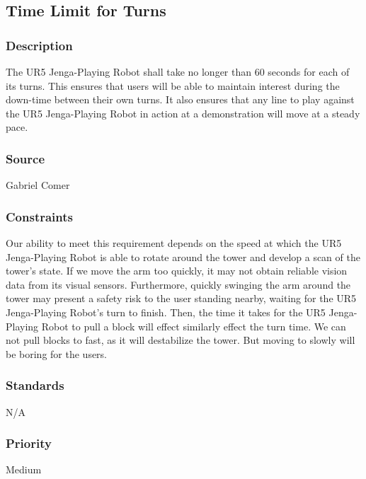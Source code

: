 \subsection{Time Limit for Turns}
\subsubsection{Description}
The UR5 Jenga-Playing Robot shall take no longer than 60 seconds for each of its turns. This ensures that users will be able to maintain interest during the down-time between their own turns. It also ensures that any line to play against the UR5 Jenga-Playing Robot in action at a demonstration will move at a steady pace.
\subsubsection{Source}
Gabriel Comer%
\subsubsection{Constraints}
Our ability to meet this requirement depends on the speed at which the UR5 Jenga-Playing Robot is able to rotate around the tower and develop a scan of the tower's state. If we move the arm too quickly, it may not obtain reliable vision data from its visual sensors. Furthermore, quickly swinging the arm around the tower may present a safety risk to the user standing nearby, waiting for the UR5 Jenga-Playing Robot's turn to finish. Then, the time it takes for the UR5 Jenga-Playing Robot to pull a block will effect similarly effect the turn time. We can not pull blocks to fast, as it will destabilize the tower. But moving to slowly will be boring for the users.
\subsubsection{Standards}
N/A
\subsubsection{Priority}
Medium